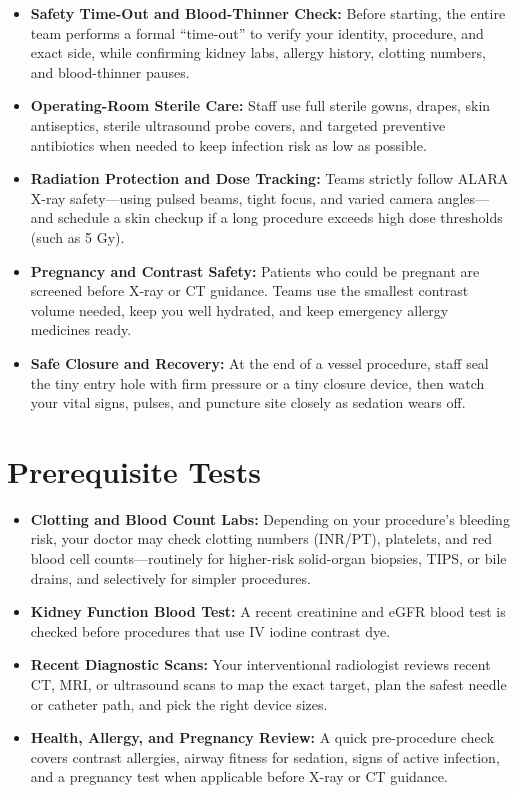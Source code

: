 \begin{itemize}
    \item \textbf{Safety Time-Out and Blood-Thinner Check:} Before starting, the entire team performs a formal ``time-out'' to verify your identity, procedure, and exact side, while confirming kidney labs, allergy history, clotting numbers, and blood-thinner pauses.
    \item \textbf{Operating-Room Sterile Care:} Staff use full sterile gowns, drapes, skin antiseptics, sterile ultrasound probe covers, and targeted preventive antibiotics when needed to keep infection risk as low as possible.
    \item \textbf{Radiation Protection and Dose Tracking:} Teams strictly follow ALARA X-ray safety---using pulsed beams, tight focus, and varied camera angles---and schedule a skin checkup if a long procedure exceeds high dose thresholds (such as 5 Gy).
    \item \textbf{Pregnancy and Contrast Safety:} Patients who could be pregnant are screened before X-ray or CT guidance. Teams use the smallest contrast volume needed, keep you well hydrated, and keep emergency allergy medicines ready.
    \item \textbf{Safe Closure and Recovery:} At the end of a vessel procedure, staff seal the tiny entry hole with firm pressure or a tiny closure device, then watch your vital signs, pulses, and puncture site closely as sedation wears off.
\end{itemize}

\section{Prerequisite Tests}

\begin{itemize}
    \item \textbf{Clotting and Blood Count Labs:} Depending on your procedure's bleeding risk, your doctor may check clotting numbers (INR/PT), platelets, and red blood cell counts---routinely for higher-risk solid-organ biopsies, TIPS, or bile drains, and selectively for simpler procedures.
    \item \textbf{Kidney Function Blood Test:} A recent creatinine and eGFR blood test is checked before procedures that use IV iodine contrast dye.
    \item \textbf{Recent Diagnostic Scans:} Your interventional radiologist reviews recent CT, MRI, or ultrasound scans to map the exact target, plan the safest needle or catheter path, and pick the right device sizes.
    \item \textbf{Health, Allergy, and Pregnancy Review:} A quick pre-procedure check covers contrast allergies, airway fitness for sedation, signs of active infection, and a pregnancy test when applicable before X-ray or CT guidance.
\end{itemize}

